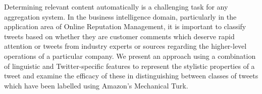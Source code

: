 Determining relevant content automatically is a challenging task for any aggregation system. In the business intelligence domain, particularly in the application area of Online Reputation Management, it is important to classify tweets based on whether they are customer comments which deserve rapid attention or tweets from industry experts or sources regarding the higher-level operations of a particular company. We present an approach using a combination of linguistic and Twitter-specific features to represent the stylistic properties of a tweet and examine the efficacy of these in distinguishing between classes of tweets which have been labelled using Amazon's Mechanical Turk.
